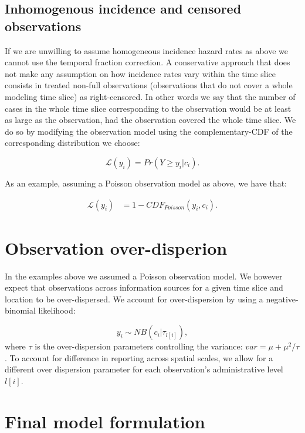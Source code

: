\documentclass[
]{article}
\begin{document}
\hypertarget{inhomogenous-incidence-and-censored-observations}{%
\subsection{Inhomogenous incidence and censored observations}\label{inhomogenous-incidence-and-censored-observations}}

If we are unwilling to assume homogeneous incidence hazard rates as above we cannot use the temporal fraction correction. A conservative approach that does not make any assumption on how incidence rates vary within the time slice consists in treated non-full observations (observations that do not cover a whole modeling time slice) as right-censored. In other words we say that the number of cases in the whole time slice corresponding to the observation would be at least as large as the observation, had the observation covered the whole time slice. We do so by modifying the observation model using the complementary-CDF of the corresponding distribution we choose:

\[
\mathcal{L}(y_i) =  Pr(Y \geq y_i|c_i).
\]

As an example, assuming a Poisson observation model as above, we have that:

\[
\begin{aligned}
\mathcal{L}(y_i) &=  1- CDF_{Poisson}(y_i, c_i).
\end{aligned}
\]

\hypertarget{observation-over-disperion}{%
\section{Observation over-disperion}\label{observation-over-disperion}}

In the examples above we assumed a Poisson observation model. We however expect that observations across information sources for a given time slice and location to be over-dispersed. We account for over-dispersion by using a negative-binomial likelihood:

\[
y_i \sim NB(c_i| \tau_{l[i]}),
\]
where \(\tau\) is the over-dispersion parameters controlling the variance: \(var = \mu + \mu^2/\tau\). To account for difference in reporting across spatial scales, we allow for a different over dispersion parameter for each observation's administrative level \(l[i]\).

\hypertarget{final-model-formulation}{%
\section{Final model formulation}\label{final-model-formulation}}
\end{document}
